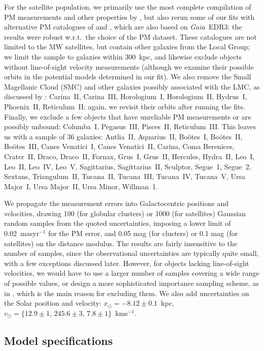 \documentclass[usenatbib,fleqn]{mnras}
\newcommand{\Gaia}{\textit{Gaia}\xspace}
\newcommand{\kms}{km\:s$^{-1}$\xspace}
\newcommand{\masyr}{mas\:yr$^{-1}$\xspace}
\begin{document}
For the satellite population, we primarily use the most complete compilation of PM measurements and other properties by \citet[tables B1 and B2]{Battaglia2021}, but also rerun some of our fits with alternative PM catalogues of \citet{McConnachie2020} and \citet{Li2021}, which are also based on \Gaia~EDR3: the results were robust w.r.t.\ the choice of the PM dataset. These catalogues are not limited to the MW satellites, but contain other galaxies from the Local Group; we limit the sample to galaxies within 300~kpc, and likewise exclude objects without line-of-sight velocity measurements (although we examine their possible orbits in the potential models determined in our fit). We also remove the Small Magellanic Cloud (SMC) and other galaxies possibly associated with the LMC, as discussed by \citet{Battaglia2021}: Carina~II, Carina~III, Horologium~I, Horologium~II, Hydrus~I, Phoenix~II, Reticulum~II; again, we revisit their orbits after running the fits. Finally, we exclude a few objects that have unreliable PM measurements or are possibly unbound: Columba~I, Pegasus~III, Pisces~II, Reticulum~III. This leaves us with a sample of 36 galaxies: Antlia~II, Aquarius~II, Bo\"otes~I, Bo\"otes~II, Bo\"otes~III, Canes Venatici~I, Canes Venatici~II, Carina, Coma Berenices, Crater~II, Draco, Draco~II, Fornax, Grus~I, Grus~II, Hercules, Hydra~II, Leo~I, Leo~II, Leo~IV, Leo~V, Sagittarius, Sagittarius~II, Sculptor, Segue~1, Segue~2, Sextans, Triangulum~II, Tucana~II, Tucana~III, Tucana~IV, Tucana~V, Ursa Major~I, Ursa Major~II, Ursa Minor, Willman~1.

We propagate the measurement errors into Galactocentric positions and velocities, drawing 100 (for globular clusters) or 1000 (for satellites) Gaussian random samples from the quoted uncertainties, imposing a lower limit of 0.02~\masyr for the PM error, and 0.05 mag (for clusters) or 0.1 mag (for satellites) on the distance modulus. The results are fairly insensitive to the number of samples, since the observational uncertainties are typically quite small, with a few exceptions discussed later. However, for objects lacking line-of-sight velocities, we would have to use a larger number of samples covering a wide range of possible values, or design a more sophisticated importance sampling scheme, as in \citet{Read2021}, which is the main reason for excluding them. We also add uncertainties on the Solar position and velocity: $x_\odot=-8.12\pm0.1$~kpc, $v_\odot=\{12.9\pm1,\, 245.6\pm3,\, 7.8\pm1\}$~\kms \citep{Drimmel2018}.

\subsection{Model specifications}  \label{sec:MW_model}
\end{document}

